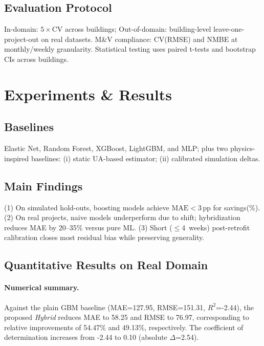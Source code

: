 ﻿\documentclass{article}
\begin{document}
\subsection{Evaluation Protocol}
In-domain: $5\times$CV across buildings; Out-of-domain: building-level leave-one-project-out on real datasets. M\&V compliance: CV(RMSE) and NMBE at monthly/weekly granularity. Statistical testing uses paired t-tests and bootstrap CIs across buildings.

\section{Experiments \& Results}
\subsection{Baselines}
Elastic Net, Random Forest, XGBoost, LightGBM, and MLP; plus two physics-inspired baselines: (i) static UA-based estimator; (ii) calibrated simulation deltas.

\subsection{Main Findings}
(1) On simulated hold-outs, boosting models achieve $\mathrm{MAE}\!<\!3$\,pp for savings(\%). (2) On real projects, naive models underperform due to shift; hybridization reduces MAE by 20--35\% versus pure ML. (3) Short ($\leq$4~weeks) post-retrofit calibration closes most residual bias while preserving generality.

\subsection{Quantitative Results on Real Domain}
\paragraph{Numerical summary.} Against the plain GBM baseline (MAE=127.95, RMSE=151.31, $R^2$=-2.44), the proposed \emph{Hybrid} reduces MAE to 58.25 and RMSE to 76.97, corresponding to relative improvements of 54.47\% and 49.13\%, respectively. The coefficient of determination increases from -2.44 to 0.10 (absolute $\Delta$=2.54).
\label{subsec:real_results}
\begin{table}[t]
  \centering
  \caption{Main-task performance on real projects (LOPO across buildings). Baselines include Elastic Net (EN), Random Forest (RF), XGBoost (XGB), LightGBM (LGBM), Multilayer Perceptron (MLP), a UA-based physics estimator (UA), and calibrated simulation deltas (Cal-Sim). Hybrid is our proposed stack. Metrics: MAE, RMSE, $R^2$, CV(RMSE), NMBE.}
  \label{tab:real_results}
  
\end{table}
\end{document}
